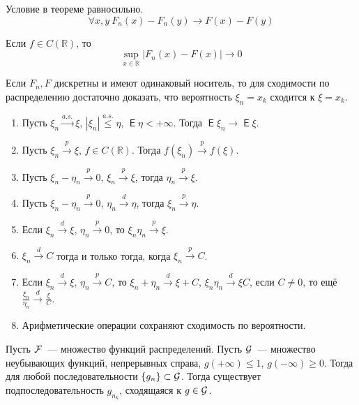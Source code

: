 \documentclass{article}
\DeclareMathOperator{\Expected}{\mathsf{E}}
\begin{document}
    \begin{remark}
        Условие в теореме равносильно.
        $$\forall x,y~F_n(x)-F_n(y)\rightarrow F(x)-F(y)$$
    \end{remark}
    \begin{remark}
        Если $f\in C(\mathbb R)$, то
        $$\sup\limits_{x\in\mathbb R}|F_n(x)-F(x)|\rightarrow0$$
    \end{remark}
    \begin{remark}
        Если $F_n,F$ дискретны и имеют одинаковый носитель, то для сходимости по распределению достаточно доказать, что вероятность $\xi_n=x_k$ сходится к $\xi=x_k$.
    \end{remark}
    \begin{theorem}
        \begin{enumerate}
            \item Пусть $\xi_n\overset{a.s.}\rightarrow\xi$, $|\xi_n|\overset{a.s.}\leqslant\eta$, $\Expected\eta<+\infty$. Тогда $\Expected\xi_n\rightarrow\Expected\xi$.
            \item Пусть $\xi_n\overset p\rightarrow\xi$, $f\in C(\mathbb R)$. Тогда $f(\xi_n)\overset p\rightarrow f(\xi)$.
            \item Пусть $\xi_n-\eta_n\overset p\rightarrow0$, $\xi_n\overset p\rightarrow\xi$, тогда $\eta_n\overset p\rightarrow\xi$.
            \item Пусть $\xi_n-\eta_n\overset p\rightarrow0$, $\eta_n\overset d\rightarrow\eta$, тогда $\xi_n\overset p\rightarrow\eta$.
            \item Если $\xi_n\overset d\rightarrow\xi$, $\eta_n\overset p\rightarrow0$, то $\xi_n\eta_n\overset p\rightarrow\xi$.
            \item $\xi_n\overset d\rightarrow C$ тогда и только тогда, когда $\xi_n\overset p\rightarrow C$.
            \item Если $\xi_n\overset d\rightarrow\xi$, $\eta_n\overset p\rightarrow C$, то $\xi_n+\eta_n\overset d\rightarrow\xi+C$, $\xi_n\eta_n\overset d\rightarrow\xi C$, если $C\neq0$, то ещё $\frac{\xi_n}{\eta_n}\overset d\rightarrow\frac{\xi}C$.
            \item Арифметические операции сохраняют сходимость по вероятности.
        \end{enumerate}
    \end{theorem}
    \begin{theorem}
        Пусть ${\mathcal{F}}$~--- множество функций распределений. Пусть ${\mathcal{G}}$~--- множество неубывающих функций, непрерывных справа, $g(+\infty)\leqslant1$, $g(-\infty)\geqslant 0$. Тогда для любой последовательности $\{g_n\}\subset{\mathcal{G}}$. Тогда существует подпоследовательность $g_{n_k}$, сходящаяся к $g\in{\mathcal{G}}$.
    \end{theorem}
\end{document}
